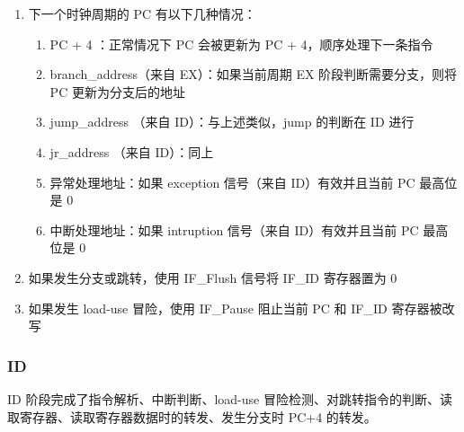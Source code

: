 \documentclass[a4paper]{article}
\begin{document}
\begin{enumerate}
  \item 下一个时钟周期的 PC 有以下几种情况：

  \begin{enumerate}
    \item PC + 4 ：正常情况下 PC 会被更新为 PC + 4，顺序处理下一条指令
    \item branch\_address（来自 EX）：如果当前周期 EX 阶段判断需要分支，则将 PC 更新为分支后的地址
    \item jump\_address （来自 ID）：与上述类似，jump 的判断在 ID 进行
    \item jr\_address （来自 ID）：同上
    \item 异常处理地址：如果 exception 信号（来自 ID）有效并且当前 PC 最高位是 0
    \item 中断处理地址：如果 intruption 信号（来自 ID）有效并且当前 PC 最高位是 0
  \end{enumerate}

  \item 如果发生分支或跳转，使用 IF\_Flush 信号将 IF\_ID 寄存器置为 0
  \item 如果发生 load-use 冒险，使用 IF\_Pause 阻止当前 PC 和 IF\_ID 寄存器被改写

\end{enumerate}

\subsubsection{ID}
\label{subs:ID}

ID 阶段完成了指令解析、中断判断、load-use 冒险检测、对跳转指令的判断、读取寄存器、读取寄存器数据时的转发、发生分支时 PC+4 的转发。
\end{document}
